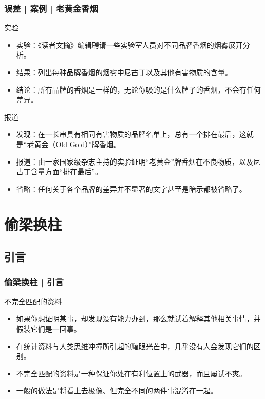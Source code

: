 \begin{frame}
  \frametitle{误差 | 案例 | 老黄金香烟}
  \begin{block}{实验}
    \begin{itemize}
      \item 实验：《读者文摘》编辑聘请一些实验室人员对不同品牌香烟的烟雾展开分析。
      \item 结果：列出每种品牌香烟的烟雾中尼古丁以及其他有害物质的含量。
      \item 结论：所有品牌的香烟是一样的，无论你吸的是什么牌子的香烟，不会有任何差异。
    \end{itemize}
  \end{block}
  \vspace{-0.3em}
  \pause
  \begin{block}{报道}
    \begin{itemize}
      \item 发现：在一长串具有相同有害物质的品牌名单上，总有一个排在最后，这就是“老黄金（Old Gold）”牌香烟。
      \item 报道：由一家国家级杂志主持的实验证明“老黄金”牌香烟在不良物质，以及尼古丁含量方面“排在最后”。
      \item 省略：任何关于各个品牌的差异并不显著的文字甚至是暗示都被省略了。
    \end{itemize}
  \end{block}
\end{frame}

\section{偷梁换柱}
\subsection{引言}
\begin{frame}
  \frametitle{偷梁换柱 | 引言}
  \begin{block}{不完全匹配的资料}
    \begin{itemize}
      \item 如果你想证明某事，却发现没有能力办到，那么就试着解释其他相关事情，并假装它们是一回事。
      \item 在统计资料与人类思维冲撞所引起的耀眼光芒中，几乎没有人会发现它们的区别。
      \item 不完全匹配的资料是一种保证你处在有利位置上的武器，而且屡试不爽。
      \item 一般的做法是将看上去极像、但完全不同的两件事混淆在一起。
    \end{itemize}
  \end{block}
\end{frame}


